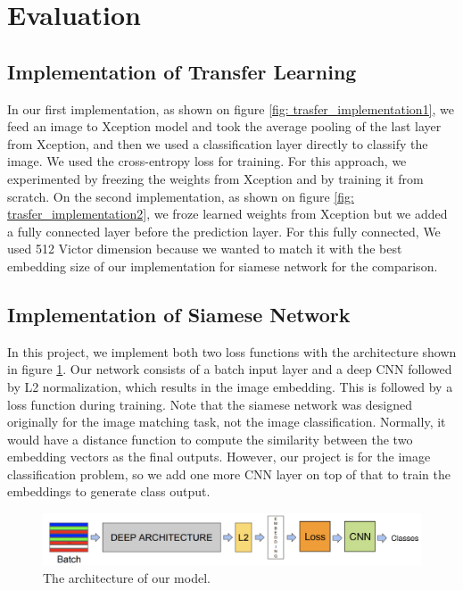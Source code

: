 \section{Evaluation}

\subsection{Implementation of Transfer Learning}
In our first implementation, as shown on figure \ref {fig: trasfer_implementation1}, we feed an image to Xception model and took the average pooling of the last layer from Xception, and then we used a classification layer directly to classify the image. We used the cross-entropy loss for training. For this approach, we experimented by freezing the weights from Xception and by training it from scratch. 
On the second implementation, as shown on figure \ref {fig: trasfer_implementation2}, we froze learned weights from Xception but we added a fully connected layer before the prediction layer. For this fully connected, We used 512 Victor dimension because we wanted to match it with the best embedding size of our implementation for siamese network for the comparison. 

\subsection{Implementation of Siamese Network}

In this project, we implement both two loss functions with the architecture shown in figure \ref{fig:model}. Our network consists of a batch input layer and a deep CNN followed by L2 normalization, which results in the image embedding. This is followed by a loss function during training. Note that the siamese network was designed originally for the image matching task, not the image classification. Normally, it would have a distance function to compute the similarity between the two embedding vectors as the final outputs. However, our project is for the image classification problem, so we add one more CNN layer on top of that to train the embeddings to generate class output.

\begin{figure}[h]
  \centering
  \includegraphics[width=\linewidth]{figs/model.png}
  \caption{The architecture of our model.}
  \label{fig:model}
\end{figure}

